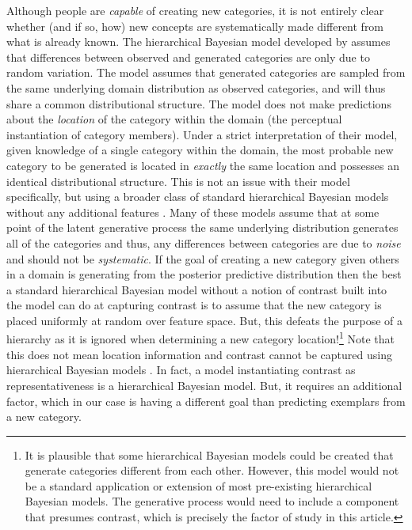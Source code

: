 \documentclass[pdflatex,sn-apa]{sn-jnl}%
\theoremstyle{thmstyleone}%
\theoremstyle{thmstyletwo}%
\theoremstyle{thmstylethree}%
\begin{document}
Although people are {\em capable} of creating 
new categories, it is not entirely clear whether (and if so, how) new concepts are systematically
made different from what is already known. The hierarchical Bayesian model
developed by \cite{jern2013probabilistic} assumes that differences between
observed and generated categories are only due to random variation. The model
assumes that generated categories are sampled from the same underlying domain
distribution as observed categories, and will thus share a common distributional
structure. The model does not make predictions about the {\em location} of the
category within the domain (the perceptual instantiation of category members).
Under a strict interpretation of their model, given knowledge of a single
category within the domain, the most probable new category to be generated is
located in {\em exactly} the same location and possesses an identical
distributional structure. This is not an issue with their model specifically,
but using a broader class of standard hierarchical Bayesian models without any
additional features \citep[e.g., ][]{griffithsscn07,kemp07}. Many of these
models assume that at some point of the latent generative process the same
underlying distribution generates all of the categories and thus, any
differences between categories are due to {\em noise} and should not be {\em
  systematic}. If the goal of creating a new category given others in a domain
is generating from the posterior predictive distribution then the best a
standard hierarchical Bayesian model without a notion of contrast built into the
model can do at capturing contrast is to assume that the new category is placed
uniformly at random over feature space. But, this defeats the purpose of a
hierarchy as it is ignored when determining a new category location!\footnote{It
  is plausible that some hierarchical Bayesian models could be created that
  generate categories different from each other. However, this model would not
  be a standard application or extension of most pre-existing hierarchical
  Bayesian models. The generative process would need to include a component that
  presumes contrast, which is precisely the factor of study in this article.} Note that this does not mean location information and
contrast cannot be captured using hierarchical Bayesian models \citep[e.g., see][]{sanborn2021}. In fact, a model
instantiating contrast as representativeness is a hierarchical Bayesian model.
But, it requires an additional factor, which in our case is having a different
goal than predicting exemplars from a new category.
\end{document}

